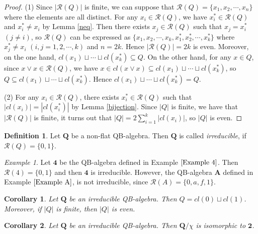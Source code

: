 \documentclass[12pt]{amsart}
\newtheorem{corollary}{Corollary}[section]
\theoremstyle{definition}
\newtheorem{definition}{Definition}[section]
\theoremstyle{remark}
\newtheorem{example}{Example}[section]
\numberwithin{equation}{section}
\begin{document}
\begin{proof}
(1) Since $|\mathscr{R}(Q)|$ is finite, we can suppose that $\mathscr{R}(Q)=\{x_{1},x_{2},\cdots, x_{n}\}$ where the elements are all distinct. For any $x_{i}\in \mathscr{R}(Q)$, we have $x_{i}^{\ast}\in \mathscr{R}(Q)$ and $x_{i}^{\ast}\neq x_{i}$ by Lemma \ref{neq}. Then there exists $x_{j}\in \mathscr{R}(Q)$ such that $x_{j}=x_{i}^{\ast}$$(j\neq i)$, so $\mathscr{R}(Q)$ can be expressed as $\{x_{1}, x_{2}, \cdots, x_{k}, x_{1}^{\ast}, x_{2}^{\ast}, \cdots, x_{k}^{\ast}\}$ where $x_{j}^{\ast}\neq x_{i}$ $(i,j=1,2,\cdots,k)$ and $n=2k$. Hence $|\mathscr{R}(Q)|=2k$ is even. Moreover, on the one hand, $cl(x_{1})\sqcup \cdots \sqcup cl(x_{k}^{\ast})\subseteq Q$. On the other hand, for any $x\in Q$, since $x\vee x\in \mathscr{R}(Q)$, we have $x\in cl(x\vee x)\subseteq cl(x_{1})\sqcup \cdots \sqcup cl(x_{k}^{\ast})$, so $Q\subseteq cl(x_{1})\sqcup \cdots \sqcup cl(x_{k}^{\ast})$. Hence $cl(x_{1})\sqcup \cdots \sqcup cl(x_{k}^{\ast})=Q$.

(2) For any $x_{i}\in \mathscr{R}(Q)$, there exists $x_{i}^{\ast}\in \mathscr{R}(Q)$ such that $|cl(x_{i})|=|cl(x_{i}^{\ast})|$ by Lemma \ref{bijection}. Since $|Q|$ is finite, we have that $|\mathscr{R}(Q)|$ is finite, it turns out that $|Q|=2\sum_{i=1}^k|cl(x_{i})|$, so $|Q|$ is even.
\end{proof}

\begin{definition}\label{Definition 4}
Let $\mathbf{Q}$ be a non-flat QB-algebra. Then $\mathbf{Q}$ is called \emph{irreducible}, if $\mathscr{R}(Q)=\{0,1\}$.
\end{definition}

\begin{example}
Let $\mathbf{4}$ be the QB-algebra defined in Example $\ref{Example 4}$. Then $\mathscr{R}(4)=\{0,1\}$ and then $\mathbf{4}$ is irreducible. However, the QB-algebra $\mathbf{A}$ defined in Example $\ref{Example A}$, is not irreducible, since $\mathscr{R}(A)=\{0,a, f,1\}$.
\end{example}

\begin{corollary} Let $\mathbf{Q}$ be an irreducible QB-algebra. Then $Q=cl(0)\sqcup cl(1)$. Moreover, if $|Q|$ is finite, then $|Q|$ is even.
\end{corollary}

\begin{corollary}\label{c3.3}
Let $\mathbf{Q}$ be an irreducible QB-algebra. Then $\mathbf{Q}/\chi$ is isomorphic to $\mathbf{2}$.
\end{corollary}
\end{document}
